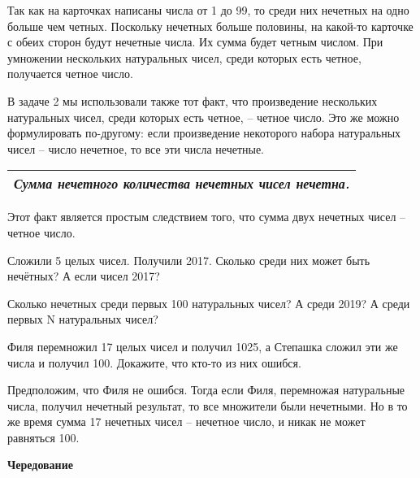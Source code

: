 \begin{prf}
	Так как на карточках написаны числа от 1 до 99, то среди них нечетных на одно больше чем четных. Поскольку нечетных больше половины, на какой-то карточке с обеих сторон будут нечетные числа. Их сумма будет четным числом. При умножении нескольких натуральных чисел, среди которых есть четное, получается четное число. 
\end{prf}

В задаче 2 мы использовали также тот факт, что произведение нескольких натуральных чисел, среди которых есть четное, – четное число. Это же можно формулировать по-другому: если произведение некоторого набора натуральных чисел – число нечетное, то все эти числа нечетные.


\begin{table}[h]\centering
	\begin{tabular}{|c|}
		\hline
		\textit{Сумма нечетного количества нечетных чисел нечетна.}\\
		\hline
	\end{tabular}
\end{table}

Этот факт является простым следствием того, что сумма двух нечетных чисел – четное число.

\begin{ex}
	Сложили 5 целых чисел. Получили 2017. Сколько среди них может быть нечётных? А если чисел 2017?
\end{ex}

\begin{ex}
	\label{u7}
	Сколько нечетных среди первых 100 натуральных	чисел?
	А среди 2019?  
	А среди первых N натуральных чисел?
\end{ex}

\begin{thm}
	Филя перемножил 17 целых чисел и получил 1025, а Степашка сложил эти же числа и получил 100. Докажите, что кто-то из них ошибся.
\end{thm}

\begin{prf}
	Предположим, что Филя не ошибся. Тогда если Филя, перемножая натуральные числа, получил нечетный результат, то все множители были нечетными. Но в то же время сумма 17 нечетных чисел – нечетное число, и никак не может равняться 100.
\end{prf}

\begin{center}
	{\large\textbf{Чередование}}
\end{center}

